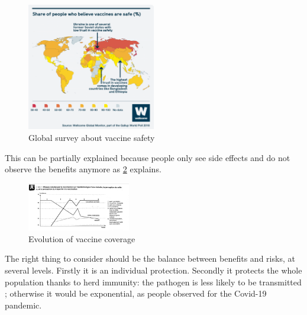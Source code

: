 \documentclass{article}
\begin{document}
                \begin{figure}
                    \centering
                    \includegraphics[width=0.5\textwidth]{imgs/VaccineHesitancy.png}
                    \caption{Global survey about vaccine safety \autocite{SurveyRevealsEuropean}}
                    \label{fig:survey}
                \end{figure}

            This can be partially explained because people only see side effects and do not observe the benefits anymore as \ref{fig:perception} explains.
        
            \begin{figure}
                    \centering
                \includegraphics[width=0.4\textwidth, angle=90]{imgs/Perception.jpg} %
                    \caption{Evolution of vaccine coverage \autocite{PILLYEtudiantMaladies}}
                \label{fig:perception}
            \end{figure}
            
            The right thing to consider should be the balance between benefits and risks, at several levels.
            Firstly it is an individual protection. 
            Secondly it protects the whole population thanks to herd immunity: the pathogen is less likely to be transmitted ; otherwise it would be exponential,
                as people observed for the Covid-19 pandemic.
        
\end{document}
